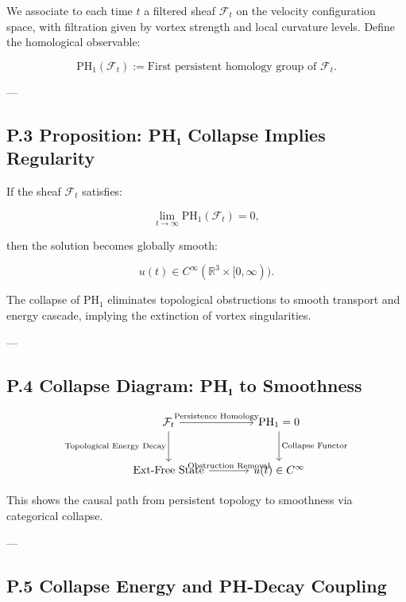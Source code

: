 \documentclass[11pt]{article}
\begin{document}
We associate to each time $t$ a filtered sheaf $\mathcal{F}_t$ on the velocity configuration space, with filtration given by vortex strength and local curvature levels. Define the homological observable:

\[
\mathrm{PH}_1(\mathcal{F}_t) := \text{First persistent homology group of } \mathcal{F}_t.
\]

---

\subsection*{P.3 Proposition: PH₁ Collapse Implies Regularity}

\begin{proposition}
\label{prop:PHcollapse}
If the sheaf $\mathcal{F}_t$ satisfies:

\[
\lim_{t \to \infty} \mathrm{PH}_1(\mathcal{F}_t) = 0,
\]

then the solution becomes globally smooth:

\[
u(t) \in C^\infty(\mathbb{R}^3 \times [0, \infty)).
\]
\end{proposition}

The collapse of $\mathrm{PH}_1$ eliminates topological obstructions to smooth transport and energy cascade, implying the extinction of vortex singularities.

---

\subsection*{P.4 Collapse Diagram: PH₁ to Smoothness}

\[
\begin{tikzcd}[row sep=large, column sep=large]
\mathcal{F}_t \arrow[r, "\text{Persistence Homology}"] \arrow[d, "\text{Topological Energy Decay}"']
& \mathrm{PH}_1 = 0 \arrow[d, "\text{Collapse Functor}"] \\
\text{Ext-Free State} \arrow[r, "\text{Obstruction Removal}"]
& u(t) \in C^\infty
\end{tikzcd}
\]

This shows the causal path from persistent topology to smoothness via categorical collapse.

---

\subsection*{P.5 Collapse Energy and PH-Decay Coupling}
\end{document}
